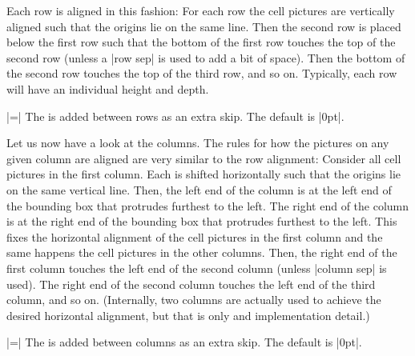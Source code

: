 Each row is aligned in this fashion: For each row the cell pictures
are vertically aligned such that the origins lie on the same
line. Then the second row is placed below the first row such that the
bottom of the first row touches the top of the second row (unless a
|row sep| is used to add a bit of space). Then the bottom of the
second row touches the top of the third row, and so on. Typically,
each row will have an individual height and depth.

\begin{itemize}
  |=|
  The  is added between rows as an extra skip. The
  default is |0pt|.
\end{itemize}

\begin{codeexample}[]
\end{codeexample}

Let us now have a look at the columns. The rules for how the pictures
on any given column are aligned are very similar to the row
alignment: Consider all cell pictures in the first column. Each is
shifted horizontally such that the origins lie on the same vertical
line. Then, the left end of the column is at the left end of the
bounding box that protrudes furthest to the left. The right end of the
column is at the right end of the bounding box that protrudes furthest
to the left. This fixes the horizontal alignment of the cell pictures
in the first column and the same happens the cell pictures in the
other columns. Then, the right end of the first column touches the
left end of the second column (unless |column sep| is used). The right
end of the second column touches the left end of the third column, and
so on. (Internally, two columns are actually used to achieve the
desired horizontal alignment, but that is only and implementation
detail.) 

\begin{itemize}
  |=|
  The  is added between columns as an extra skip. The
  default is |0pt|.
\end{itemize}

